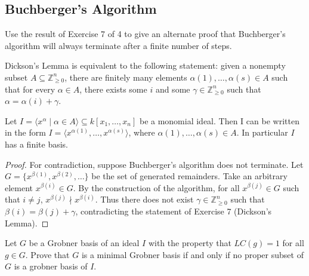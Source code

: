 \subsection{Buchberger's Algorithm}


\begin{tcolorbox}[title=Problem 4, breakable]
    Use the result of Exercise 7 of 4
    to give an alternate proof that 
    Buchberger's algorithm will always terminate after 
    a finite number of steps.
\end{tcolorbox}

\begin{theorem}[Exercise 7]
    Dickson's Lemma is equivalent to the following statement: given a 
    nonempty subset $A \subseteq \mathbb{Z}_{\ge 0}^n$, there are finitely many 
    elements $\alpha(1), \ldots, \alpha(s) \in A$ such that 
    for every $\alpha \in A$, there exists some $i$ and some $\gamma \in \mathbb{Z}_{\ge 0}^n$ such that $\alpha = \alpha(i) + \gamma$.
\end{theorem}

\begin{theorem}
    Let $I = \langle x^\alpha \mid \alpha \in A \rangle \subseteq k[x_1, \ldots, x_n]$
    be a monomial ideal. Then I can be written in the form 
    $I = \langle x^{\alpha(1)}, \ldots, x^{\alpha(s)} \rangle$, where 
    $\alpha(1), \ldots, \alpha(s) \in A$. In particular $I$ has a finite basis.
\end{theorem}

\begin{proof}
    For contradiction, suppose Buchberger's algorithm does not terminate.
    Let $G = \{x^{\beta(1)}, x^{\beta(2)}, \ldots\}$ be the set of generated remainders.
    Take an arbitrary element $x^{\beta(i)} \in G$.
    By the construction of the algorithm, for all $x^{\beta(j)} \in G$ such that $i \ne j$,
        $x^{\beta(j)} \nmid x^{\beta(i)}$.
    Thus there does not exist $\gamma \in \mathbb{Z}_{\ge 0}^n$ such that 
        $\beta(i) = \beta(j) + \gamma$,
        contradicting the statement of Exercise 7 (Dickson's Lemma).
\end{proof}

\begin{tcolorbox}[title=Problem 5, breakable]
    Let $G$ be a Grobner basis of an ideal $I$
    with the property that $LC(g) = 1$ for all $g \in G$.
    Prove that $G$ is a minimal Grobner basis if and only if
    no proper subset of $G$ is a grobner basis of $I$.
\end{tcolorbox}

